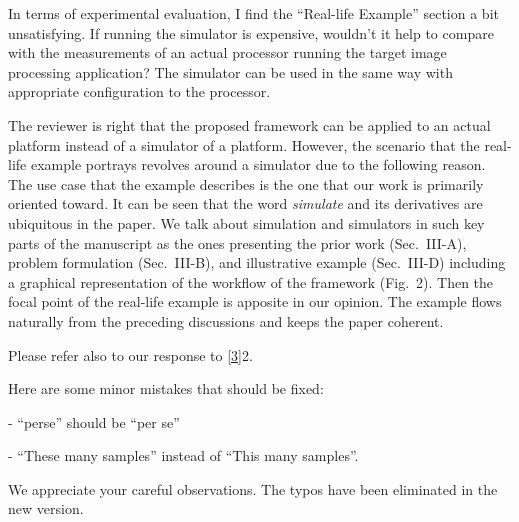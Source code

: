 \begin{reviewer}
In terms of experimental evaluation, I find the ``Real-life Example'' section a
bit unsatisfying. If running the simulator is expensive, wouldn't it help to
compare with the measurements of an actual processor running the target image
processing application? The simulator can be used in the same way with
appropriate configuration to the processor.
\end{reviewer}

\begin{authors}
The reviewer is right that the proposed framework can be applied to an actual
platform instead of a simulator of a platform. However, the scenario that the
real-life example portrays revolves around a simulator due to the following
reason. The use case that the example describes is the one that our work is
primarily oriented toward. It can be seen that the word \emph{simulate} and its
derivatives are ubiquitous in the paper. We talk about simulation and simulators
in such key parts of the manuscript as the ones presenting the prior work
(Sec.~III-A), problem formulation (Sec.~III-B), and illustrative example
(Sec.~III-D) including a graphical representation of the workflow of the
framework (Fig.~2). Then the focal point of the real-life example is apposite in
our opinion. The example flows naturally from the preceding discussions and
keeps the paper coherent.

Please refer also to our response to \cref{3}{2}.
\end{authors}

\begin{reviewer}
Here are some minor mistakes that should be fixed:

\noindent- ``perse'' should be ``per se''

\noindent- ``These many samples'' instead of ``This many samples''.
\end{reviewer}

\begin{authors}
We appreciate your careful observations. The typos have been eliminated in the
new version.

\begin{actions}
\end{actions}
\end{authors}
